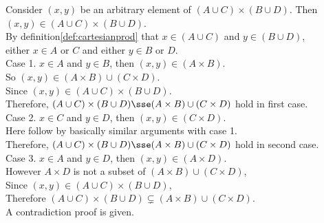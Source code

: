 \documentclass{report}
\begin{document}
\begin{prf}
Consider $(x,y)$ be an arbitrary element of $(A \cup C) \times (B \cup D)$. Then $(x,y) \in (A \cup C) \times (B \cup D)$.\\
By definition\ref{def:cartesianprod} that $x \in (A \cup C)$ and $y \in (B \cup D)$,\\
either $x \in A$ or $C$ and either $y \in B$ or $D$.\\

Case 1. $x \in A$ and $y \in B$, then $(x,y) \in (A \times B)$.\\
So $(x,y) \in (A \times B) \cup (C \times D)$.\\
Since $(x,y) \in (A \cup C) \times (B \cup D)$.\\
Therefore, $(A \cup C) \times (B \cup D) \sse (A \times B) \cup (C \times D)$ hold in first case.\\

Case 2. $x \in C$ and $y \in D$, then $(x,y) \in (C \times D)$.\\
Here follow by basically similar arguments with case 1.\\
Therefore, $(A \cup C) \times (B \cup D) \sse (A \times B) \cup (C \times D)$ hold in second case.\\

Case 3. $x \in A$ and $y \in D$, then $(x,y) \in (A \times D)$.\\
However $A \times D$ is not a subset of $(A \times B) \cup (C \times D)$,\\
Since $(x,y) \in (A \cup C) \times (B \cup D)$,\\
Therefore $(A \cup C) \times (B \cup D) \varsubsetneq (A \times B) \cup (C \times D)$.\\
\newline
A contradiction proof is given.

\Qed
\end{prf}
\end{document}
